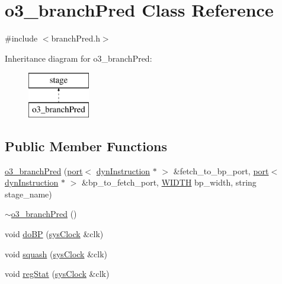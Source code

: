 \hypertarget{classo3__branchPred}{
\section{o3\_\-branchPred Class Reference}
\label{classo3__branchPred}
}


{\ttfamily \#include $<$branchPred.h$>$}

Inheritance diagram for o3\_\-branchPred:\begin{figure}[H]
\begin{center}
\leavevmode
\includegraphics[height=2.000000cm]{classo3__branchPred}
\end{center}
\end{figure}
\subsection*{Public Member Functions}
\begin{DoxyCompactItemize}
\item 
\hyperlink{classo3__branchPred_ad491f8c1906fecc1336585bed1677079}{o3\_\-branchPred} (\hyperlink{classport}{port}$<$ \hyperlink{classdynInstruction}{dynInstruction} $\ast$ $>$ \&fetch\_\-to\_\-bp\_\-port, \hyperlink{classport}{port}$<$ \hyperlink{classdynInstruction}{dynInstruction} $\ast$ $>$ \&bp\_\-to\_\-fetch\_\-port, \hyperlink{global_2global_8h_a6fa2e24b8a418fa215e183264cbea3aa}{WIDTH} bp\_\-width, string stage\_\-name)
\item 
\hyperlink{classo3__branchPred_ab497c6edb4266e04ae0b20969caeb525}{$\sim$o3\_\-branchPred} ()
\item 
void \hyperlink{classo3__branchPred_ab70a61011f52674364f5a24f276973b3}{doBP} (\hyperlink{classsysClock}{sysClock} \&clk)
\item 
void \hyperlink{classo3__branchPred_a41218ba2c469ee35610ed5b1af5e49c0}{squash} (\hyperlink{classsysClock}{sysClock} \&clk)
\item 
void \hyperlink{classo3__branchPred_a58f7e7a2260333813a3fa672eff86796}{regStat} (\hyperlink{classsysClock}{sysClock} \&clk)
\end{DoxyCompactItemize}


